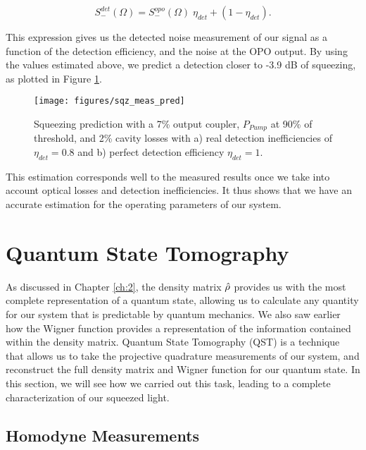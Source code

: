 \begin{equation}
  \label{eq:loss_variance}
  S^{det}_{-}(\Omega) = S^{opo}_{-}(\Omega) \; \eta_{det} + (1 - \eta_{det}).
\end{equation}

\noindent
This expression gives us the detected noise measurement of our signal as a function of the detection efficiency, and the noise at the OPO output.  By using the values estimated above, we predict a detection closer to -3.9 dB of squeezing, as plotted in Figure \ref{fig:sqz_meas_pred}. 

\begin{figure}[!ht] 
 \centering 
 \texttt{[image: figures/sqz\_meas\_pred]} 
 \caption[Estimation of squeezing production in our OPO]{Squeezing prediction with a 7\% output coupler, $P_{Pump}$ at 90\% of threshold, and 2\% cavity losses with a) real detection inefficiencies of $\eta_{det}=0.8$  and b) perfect detection efficiency $\eta_{det}=1$.} 
 \label{fig:sqz_meas_pred} 
\end{figure}

This estimation corresponds well to the measured results once we take into account optical losses and detection inefficiencies.  It thus shows that we have an accurate estimation for the operating parameters of our system.

\section{Quantum State Tomography}
\label{quantum_state_reconstruction} 

As discussed in Chapter \ref{ch:2}, the density matrix $\hat{\rho}$ provides us with the most complete representation of a quantum state, allowing us to calculate any quantity for our system that is predictable by quantum mechanics.  We also saw earlier how the Wigner function provides a representation of the information contained within the density matrix.  Quantum State Tomography (QST) is a technique that allows us to take the projective quadrature measurements of our system, and reconstruct the full density matrix and Wigner function for our quantum state.  In this section, we will see how we carried out this task, leading to a complete characterization of our squeezed light.

\subsection{Homodyne Measurements} 
\label{homodyne_measurements} 

